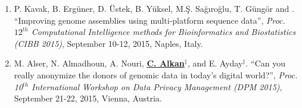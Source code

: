 
\begin{enumerate}

  \item      
    P. Kavak, B. Ergüner, D. Üstek, B. Yüksel, M.Ş. Sağıroğlu, T. Güngör and \calkan{}.
    ``Improving genome assemblies using multi-platform sequence data'',
    {\em Proc. $12^{th}$ Computational Intelligence methods for Bioinformatics and Biostatistics (CIBB 2015)}, 
    September 10-12, 2015, Naples, Italy.
    
  \item        
    M. Alser, N. Almadhoun, A. Nouri, {\bf {\underline{C. Alkan}}}$^\ddag$, and E. Ayday$^\ddag$. 
    ``Can you really anonymize the donors of genomic data in today's digital world?'',
    {\em Proc. 10$^{th}$ International Workshop on Data Privacy Management (DPM 2015)}, 
    September 21-22, 2015, Vienna, Austria.

\end{enumerate}

